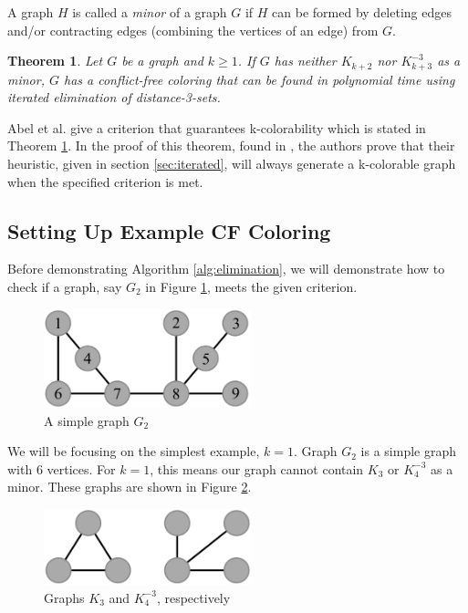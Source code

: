 \documentclass{sig-alternate}
\newtheorem{theorem}{Theorem}
\begin{document}
A graph $H$ is called a \emph{minor} of a graph $G$ if $H$ can be formed by deleting edges and/or contracting edges (combining the vertices of an edge) from $G$. \cite{abel2017three,bondy1976graph}

\begin{theorem} \label{thm:criterion}
Let $G$ be a graph and $k \geq 1$. If $G$ has neither $K_{k+2}$ nor $K_{k+3}^{-3}$ as a minor, $G$ has a conflict-free coloring that can be found in polynomial time using iterated elimination of distance-3-sets.
\end{theorem}

Abel et al. give a criterion that guarantees k-colorability which is stated in Theorem \ref{thm:criterion}. In the proof of this theorem, found in \cite{abel2017three}, the authors prove that their heuristic, given in section \ref{sec:iterated}, will always generate a k-colorable graph when the specified criterion is met.

\subsection{Setting Up Example CF Coloring}
Before demonstrating Algorithm \ref{alg:elimination}, we will demonstrate how to check if a graph, say $G_2$ in Figure \ref{fig:criterion}, meets the given criterion.

\begin{figure}[h]
	\centering
	\includegraphics[width=6cm]{../figures/criterion.pdf}
	\caption{A simple graph $G_2$}\label{fig:criterion}
\end{figure}

We will be focusing on the simplest example, $k = 1$. Graph $G_2$ is a simple graph with 6 vertices. For $k = 1$, this means our graph cannot contain $K_{3}$ or $K_{4}^{-3}$ as a minor. These graphs are shown in Figure \ref{fig:bad-criterion}.

\begin{figure}[h]
	\centering
	\includegraphics[width=6cm]{../figures/bad-criterion.pdf}
	\caption{Graphs $K_{3}$ and $K_{4}^{-3}$, respectively}\label{fig:bad-criterion}
\end{figure}
\end{document}
